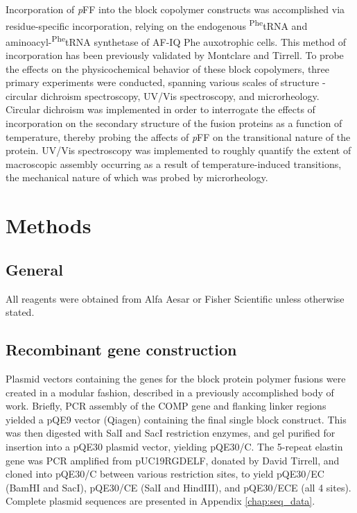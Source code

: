 \begin{refsection}
Incorporation of \emph{p}FF into the block copolymer constructs was accomplished
via residue-specific incorporation, relying on the endogenous
\textsuperscript{Phe}tRNA and aminoacyl-\textsuperscript{Phe}tRNA synthetase of
AF-IQ Phe auxotrophic cells. This method of incorporation has been previously
validated by Montclare and
Tirrell.\cite{Voloshchuk2009,Panchenko2006,Baker2011,Sharma2000,Yoshikawa1994}
To probe the effects on the physicochemical behavior of these block copolymers,
three primary experiments were conducted, spanning various scales of structure -
circular dichroism spectroscopy, UV/Vis spectroscopy, and microrheology.
Circular dichroism was implemented in order to interrogate the effects of
incorporation on the secondary structure of the fusion proteins as a function of
temperature, thereby probing the affects of \emph{p}FF on the transitional
nature of the protein. UV/Vis spectroscopy was implemented to roughly quantify
the extent of macroscopic assembly occurring as a result of temperature-induced
transitions, the mechanical nature of which was probed by microrheology. 

\section{Methods}

\subsection{General}

All reagents were obtained from Alfa Aesar or Fisher
Scientific unless otherwise stated.

\subsection{Recombinant gene construction}

Plasmid vectors containing the genes for the block protein polymer fusions were
created in a modular fashion, described in a previously accomplished body of
work.\cite{Haghpanah2009} Briefly, PCR assembly of the COMP gene and
flanking linker regions yielded a pQE9 vector (Qiagen) containing the final
single block construct.\cite{Kwon2003} This was then digested with SalI and SacI restriction
enzymes, and gel purified for insertion into a pQE30 plasmid vector, yielding
pQE30/C. The 5-repeat elastin gene was PCR amplified from pUC19RGDELF, donated
by David Tirrell, and cloned into pQE30/C between various restriction sites, to
yield pQE30/EC (BamHI and SacI), pQE30/CE (SalI and HindIII), and pQE30/ECE (all
4 sites). Complete plasmid sequences are presented in Appendix
\ref{chap:seq_data}. 


\end{refsection}
